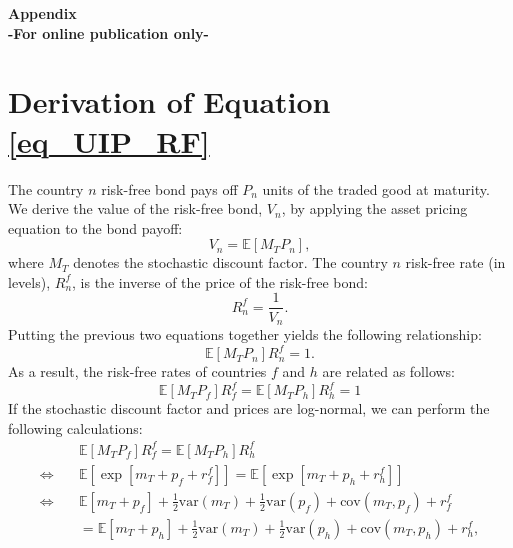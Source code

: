 \appendix

\begin{center}
  {\Huge\bf Appendix}\\
  {\large\bf -For online publication only-}
\end{center}

\section{Derivation of Equation \ref{eq_UIP_RF} \label{Appendix_ReducedFormResults}}

The country $n$ risk-free bond pays off $P_n$ units of the traded good at maturity. We derive the value of the risk-free bond, $V_n$, by applying the asset pricing equation to the bond payoff: 
\begin{equation*}
  V_n = \mathbb{E}\left[M_{T} P_n
  \right],
\end{equation*}
where $M_{T}$ denotes the stochastic discount factor. The country $n$ risk-free rate (in levels), $R^f_n$, is the inverse of the price of the risk-free bond:
\begin{equation*}
  R^f_n = \frac{1}{V_n}.
\end{equation*}
Putting the previous two equations together yields the following relationship:
\begin{equation*}
  \mathbb{E}\left[ M_T P_n \right] R^f_n = 1.
\end{equation*}
As a result, the risk-free rates of countries $f$ and $h$ are related as follows:
\begin{equation*}
  \mathbb{E}\left[M_T P_f \right] R^f_f 
  = \mathbb{E}\left[M_T P_h \right] R^f_h = 1
\end{equation*} 
If the stochastic discount factor and prices are log-normal, we can perform the following calculations:
\begin{align*}
  & \mathbb{E}\left[M_{T} P_f \right] R^f_f
    = \mathbb{E}\left[M_{T} P_h \right] R^f_h \\
  \Leftrightarrow\quad
  & \mathbb{E}\left[\exp\left[ m_T + p_f + r^f_f \right]\right]
    = \mathbb{E}\left[\exp\left[ m_T + p_h + r^f_h \right]\right] \\
  \Leftrightarrow\quad
  & \mathbb{E}\left[m_T + p_f\right] + \frac{1}{2}\text{var}\left(m_T\right) +      \frac{1}{2}\text{var}\left(p_f\right) + \text{cov}\left(m_{T}, p_f\right) + r^f_f \\
  & = \mathbb{E}\left[m_{T}+ p_h\right] + \frac{1}{2}\text{var}\left(m_{T}\right) + \frac{1}{2}\text{var}\left(p_h\right) + \text{cov}\left(m_T, p_h\right) + r^f_h,
\end{align*}
